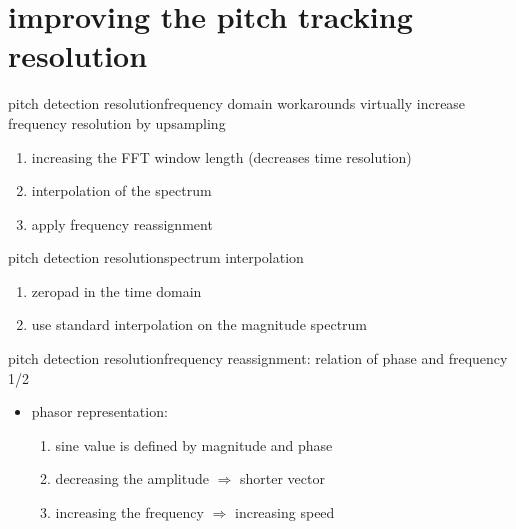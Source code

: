     \section[frequency domain]{improving the pitch tracking resolution}
        \begin{frame}{pitch detection resolution}{frequency domain workarounds}
            virtually increase frequency resolution by upsampling
            \begin{enumerate}
                \item<1->   increasing the FFT window length (decreases time resolution)
                \bigskip
                \item<2->   interpolation of the spectrum
                \bigskip
                \item<3->   apply frequency reassignment
            \end{enumerate}
        \end{frame}
        \begin{frame}{pitch detection resolution}{spectrum interpolation}
            
            \begin{enumerate}
                \item<1->   zeropad in the time domain
                \item<1->   use standard interpolation on the magnitude spectrum
            \end{enumerate}
        \end{frame}
        \begin{frame}{pitch detection resolution}{frequency reassignment: relation of phase and frequency 1/2}
           \begin{itemize}
                \item   phasor representation:
                    \begin{enumerate}
                        \item   sine value is defined by magnitude and phase
                        \item   decreasing the amplitude $\Rightarrow$ shorter vector
                        \item   increasing the frequency $\Rightarrow$ increasing speed
                    \end{enumerate}
            \end{itemize}
        \end{frame}
